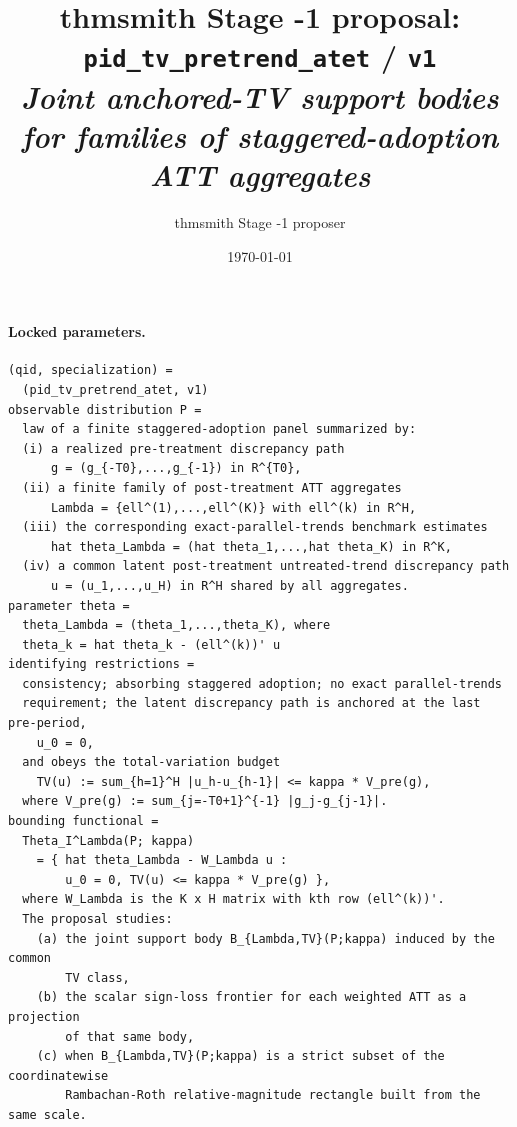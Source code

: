 \documentclass[11pt]{article}
\title{thmsmith Stage -1 proposal: \texttt{pid\_tv\_pretrend\_atet} / \texttt{v1}%
  \\ \large\textit{Joint anchored-TV support bodies for families of staggered-adoption ATT aggregates}}
\author{thmsmith Stage -1 proposer}
\date{\today}
\theoremstyle{definition}
\theoremstyle{plain}
\theoremstyle{remark}
\begin{document}
\maketitle


\paragraph{Locked parameters.}
\begin{verbatim}
(qid, specialization) =
  (pid_tv_pretrend_atet, v1)
observable distribution P =
  law of a finite staggered-adoption panel summarized by:
  (i) a realized pre-treatment discrepancy path
      g = (g_{-T0},...,g_{-1}) in R^{T0},
  (ii) a finite family of post-treatment ATT aggregates
      Lambda = {ell^(1),...,ell^(K)} with ell^(k) in R^H,
  (iii) the corresponding exact-parallel-trends benchmark estimates
      hat theta_Lambda = (hat theta_1,...,hat theta_K) in R^K,
  (iv) a common latent post-treatment untreated-trend discrepancy path
      u = (u_1,...,u_H) in R^H shared by all aggregates.
parameter theta =
  theta_Lambda = (theta_1,...,theta_K), where
  theta_k = hat theta_k - (ell^(k))' u
identifying restrictions =
  consistency; absorbing staggered adoption; no exact parallel-trends
  requirement; the latent discrepancy path is anchored at the last pre-period,
    u_0 = 0,
  and obeys the total-variation budget
    TV(u) := sum_{h=1}^H |u_h-u_{h-1}| <= kappa * V_pre(g),
  where V_pre(g) := sum_{j=-T0+1}^{-1} |g_j-g_{j-1}|.
bounding functional =
  Theta_I^Lambda(P; kappa)
    = { hat theta_Lambda - W_Lambda u :
        u_0 = 0, TV(u) <= kappa * V_pre(g) },
  where W_Lambda is the K x H matrix with kth row (ell^(k))'.
  The proposal studies:
    (a) the joint support body B_{Lambda,TV}(P;kappa) induced by the common
        TV class,
    (b) the scalar sign-loss frontier for each weighted ATT as a projection
        of that same body,
    (c) when B_{Lambda,TV}(P;kappa) is a strict subset of the coordinatewise
        Rambachan-Roth relative-magnitude rectangle built from the same scale.
\end{verbatim}
\end{document}

